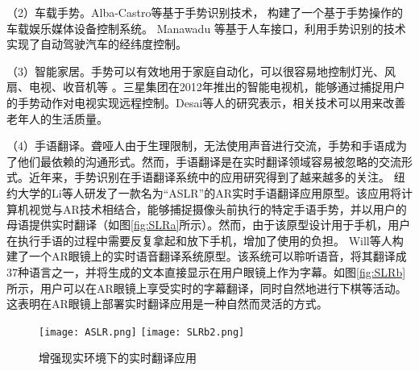 （2）车载手势。Alba-Castro等基于手势识别技术， 构建了一个基于手势操作的车载娱乐媒体设备控制系统\cite{parada2014hand}。 Manawadu 等基于人车接口，利用手势识别的技术实现了自动驾驶汽车的经纬度控制\cite{manawadu2016hand}。

（3）智能家居。手势可以有效地用于家庭自动化，可以很容易地控制灯光、风扇、电视、收音机等 。三星集团在2012年推出的智能电视机，能够通过捕捉用户的手势动作对电视实现远程控制。Desai等人的研究表示，相关技术可以用来改善老年人的生活质量\cite{desai2017human}。

（4）手语翻译。聋哑人由于生理限制，无法使用声音进行交流，手势和手语成为了他们最依赖的沟通形式。然而，手语翻译是在实时翻译领域容易被忽略的交流形式\cite{SLR1}。近年来，手势识别在手语翻译系统中的应用研究得到了越来越多的关注\cite{伍杰2019基于视觉的实时手势识别方法研究}。
纽约大学的Li等人研发了一款名为“ASLR”的AR实时手语翻译应用原型\cite{SLR1}。该应用将计算机视觉与AR技术相结合，能够捕捉摄像头前执行的特定手语手势，并以用户的母语提供实时翻译（如图\ref{fig:SLRa}所示）。然而，由于该原型设计用于手机，用户在执行手语的过程中需要反复拿起和放下手机，增加了使用的负担。
Will等人构建了一个AR眼镜上的实时语音翻译系统原型\cite{SLR2}。该系统可以聆听语音，将其翻译成37种语言之一，并将生成的文本直接显示在用户眼镜上作为字幕。如图\ref{fig:SLRb}所示，用户可以在AR眼镜上享受实时的字幕翻译，同时自然地进行下棋等活动。这表明在AR眼镜上部署实时翻译应用是一种自然而灵活的方式。

\begin{figure}
  \centering
    {\texttt{[image: ASLR.png]}}
    {\texttt{[image: SLRb2.png]}}
  \caption{增强现实环境下的实时翻译应用}
  \label{fig:SLR}
\end{figure}

